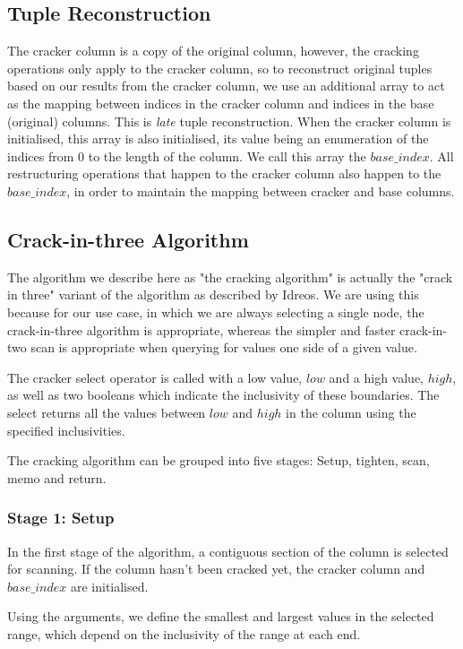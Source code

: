 \subsection{Tuple Reconstruction}

The cracker column is a copy of the original column, however, the cracking operations only apply to the cracker column, so to reconstruct original tuples based on our results from the cracker column, we use an additional array to act as the mapping between indices in the cracker column and indices in the base (original) columns. This is \textit{late} tuple reconstruction. When the cracker column is initialised, this array is also initialised, its value being an enumeration of the indices from 0 to the length of the column. We call this array the $base\_index$. All restructuring operations that happen to the cracker column also happen to the $base\_index$, in order to maintain the mapping between cracker and base columns.

\subsection{Crack-in-three Algorithm}

The algorithm we describe here as "the cracking algorithm" is actually the "crack in three" variant of the algorithm as described by Idreos. We are using this because for our use case, in which we are always selecting a single node, the crack-in-three algorithm is appropriate, whereas the simpler and faster crack-in-two scan is appropriate when querying for values one side of a given value.

The cracker select operator is called with a low value, $low$ and a high value, $high$, as well as two booleans which indicate the inclusivity of these boundaries. The select returns all the values between $low$ and $high$ in the column using the specified inclusivities.

The cracking algorithm can be grouped into five stages: Setup, tighten, scan, memo and return.

\subsubsection{Stage 1: Setup}

In the first stage of the algorithm, a contiguous section of the column is selected for scanning. If the column hasn't been cracked yet, the cracker column and $base\_index$ are initialised.

Using the arguments, we define the smallest and largest values in the selected range, which depend on the inclusivity of the range at each end.

